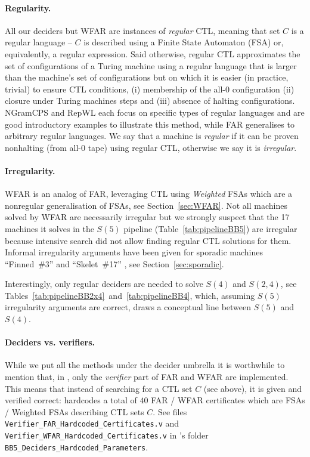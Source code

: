 \paragraph{Regularity.} All our deciders but WFAR are instances of \textit{regular} CTL, meaning that set $C$ is a regular language -- \ie $C$ is described using a Finite State Automaton (FSA) or, equivalently, a regular expression. Said otherwise, regular CTL approximates the set of configurations of a Turing machine using a regular language that is larger than the machine's set of configurations but on which it is easier (in practice, trivial) to ensure CTL conditions, \ie (i) membership of the all-0 configuration (ii) closure under Turing machines steps and (iii) absence of halting configurations. NGramCPS and RepWL each focus on specific types of regular languages and are good introductory examples to illustrate this method, while FAR generalises to arbitrary regular languages. We say that a machine is \textit{regular} if it can be proven nonhalting (from all-0 tape) using regular CTL, otherwise we say it is \textit{irregular}.

\paragraph{Irregularity.} WFAR is an analog of FAR, leveraging CTL using \textit{Weighted} FSAs which are a nonregular generalisation of FSAs, see Section~\ref{sec:WFAR}. Not all machines solved by WFAR are necessarily irregular but we strongly suspect that the 17 machines it solves in the $S(5)$ pipeline (Table~\ref{tab:pipelineBB5}) are irregular because intensive search did not allow finding regular CTL solutions for them. Informal irregularity arguments have been given for sporadic machines ``Finned~\#3'' and ``Skelet~\#17'' \cite{irregularFinned3, irregularSk17}, see Section~\ref{sec:sporadic}.

Interestingly, only regular deciders are needed to solve $S(4)$ and $S(2,4)$, see Tables~\ref{tab:pipelineBB2x4}~and~\ref{tab:pipelineBB4}, which, assuming $S(5)$ irregularity arguments are correct, draws a conceptual line between $S(5)$ and $S(4)$.

\paragraph{Deciders vs. verifiers.} While we put all the methods under the decider umbrella it is worthwhile to mention that, in \CoqBB, only the \textit{verifier} part of FAR and WFAR are implemented. This means that instead of searching for a CTL set $C$ (see above), it is given and verified correct: \CoqBB hardcodes a total of $40$ FAR /
WFAR certificates which are FSAs / Weighted FSAs describing CTL sets $C$. See files \texttt{Verifier\_FAR\_Hardcoded\_Certificates.v} and \texttt{Verifier\_WFAR\_Hardcoded\_Certificates.v} in \CoqBB's folder \texttt{BB5\_Deciders\_Hardcoded\_Parameters}.

